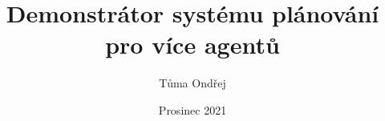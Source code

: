 \worktype [O/EN]
\title {Demonstrátor systému plánování pro více agentů}
\author {Tůma Ondřej}
\supervisor {\kulich}
\date {Prosinec 2021}